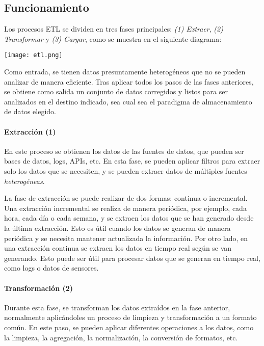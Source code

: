 \subsection{Funcionamiento}
Los procesos ETL se dividen en tres fases principales: \textit{(1) Extraer},
\textit{(2) Transformar} y \textit{(3) Cargar}, como se muestra en el siguiente
diagrama:

\begin{minipage}{\linewidth}
	\centering
	\texttt{[image: etl.png]}
\end{minipage}

Como entrada, se tienen datos presuntamente heterogéneos que no se pueden
analizar de manera eficiente. Tras aplicar todos los pasos de las fases
anteriores, se obtiene como salida un conjunto de datos corregidos y listos para
ser analizados en el destino indicado, sea cual sea el paradigma de
almacenamiento de datos elegido.

\paragraph{Extracción (1)}
En este proceso se obtienen los datos de las fuentes de datos, que pueden ser
bases de datos, logs, APIs, etc. En esta fase, se pueden aplicar filtros para
extraer solo los datos que se necesiten, y se pueden extraer datos de múltiples
fuentes \emph{heterogéneas}.

La fase de extracción se puede realizar de dos formas: continua o incremental.
Una extracción incremental se realiza de manera periódica, por ejemplo, cada
hora, cada día o cada semana, y se extraen los datos que se han generado desde
la última extracción. Esto es útil cuando los datos se generan de manera
periódica y se necesita mantener actualizada la información. Por otro lado, en
una extracción continua se extraen los datos en tiempo real según se van
generando. Esto puede ser útil para procesar datos que se generan en tiempo
real, como logs o datos de sensores.


\newpage{}
\paragraph{Transformación (2)}
Durante esta fase, se transforman los datos extraídos en la fase anterior,
normalmente aplicándoles un proceso de limpieza y transformación a un
formato común. En este paso, se pueden aplicar diferentes operaciones a los
datos, como la limpieza, la agregación, la normalización, la conversión de
formatos, etc.

